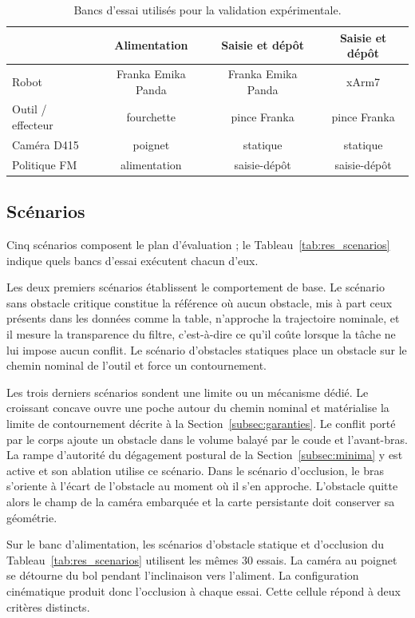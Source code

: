 \begin{table}[htbp]
\centering
\caption{Bancs d'essai utilisés pour la validation expérimentale.}
\label{tab:res_bancs}
\begin{tabular}{lccc}
\toprule
 & Alimentation & Saisie et dépôt & Saisie et dépôt \\
\midrule
Robot & Franka Emika Panda & Franka Emika Panda & xArm7 \\
Outil / effecteur & fourchette & pince Franka & pince Franka \\
Caméra D415 & poignet & statique & statique \\
Politique \ac{FM} & alimentation & saisie-dépôt & saisie-dépôt \\
\bottomrule
\end{tabular}
\end{table}

\subsection{Scénarios}\label{subsec:res_scenarios}
Cinq scénarios composent le plan d'évaluation ; le Tableau~\ref{tab:res_scenarios} indique quels bancs d'essai exécutent chacun d'eux.

Les deux premiers scénarios établissent le comportement de base. Le scénario sans obstacle critique constitue la référence où aucun obstacle, mis à part ceux présents dans les données comme la table, n'approche la trajectoire nominale, et il mesure la transparence du filtre, c'est-à-dire ce qu'il coûte lorsque la tâche ne lui impose aucun conflit. Le scénario d'obstacles statiques place un obstacle sur le chemin nominal de l'outil et force un contournement.

Les trois derniers scénarios sondent une limite ou un mécanisme dédié. Le croissant concave ouvre une poche autour du chemin nominal et matérialise la limite de contournement décrite à la Section~\ref{subsec:garanties}. Le conflit porté par le corps ajoute un obstacle dans le volume balayé par le coude et l'avant-bras. La rampe d'autorité du dégagement postural de la Section~\ref{subsec:minima} y est active et son ablation utilise ce scénario. Dans le scénario d'occlusion, le bras s'oriente à l'écart de l'obstacle au moment où il s'en approche. L'obstacle quitte alors le champ de la caméra embarquée et la carte persistante doit conserver sa géométrie.

Sur le banc d'alimentation, les scénarios d'obstacle statique et d'occlusion du Tableau~\ref{tab:res_scenarios} utilisent les mêmes $30$ essais. La caméra au poignet se détourne du bol pendant l'inclinaison vers l'aliment. La configuration cinématique produit donc l'occlusion à chaque essai. Cette cellule répond à deux critères distincts.

